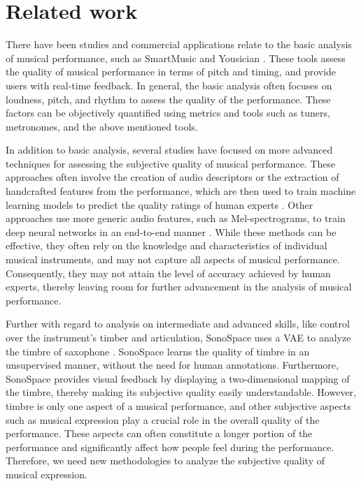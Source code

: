 \documentclass[manuscript,review,anonymous]{acmart}
\begin{document}
\section{Related work}
There have been studies and commercial applications relate to the basic analysis of musical performance, such as SmartMusic \cite{SmartMus76:online} and Yousician \cite{Yousicia62:online}. 
These tools assess the quality of musical performance in terms of pitch and timing, and provide users with real-time feedback. 
In general, the basic analysis often focuses on loudness, pitch, and rhythm to assess the quality of the performance.
These factors can be objectively quantified using metrics and tools such as tuners, metronomes, and the above mentioned tools. 

In addition to basic analysis, several studies have focused on more advanced techniques for assessing the subjective quality of musical performance. 
These approaches often involve the creation of audio descriptors or the extraction of handcrafted features from the performance, which are then used to train machine learning models to predict the quality ratings of human experts \cite{nakano2006automatic,PDFAreal4:online, vidwans2017objective}. 
Other approaches use more generic audio features, such as Mel-spectrograms, to train deep neural networks in an end-to-end manner \cite{app8040507}. 
While these methods can be effective, they often rely on the knowledge and characteristics of individual musical instruments, and may not capture all aspects of musical performance. 
Consequently, they may not attain the level of accuracy achieved by human experts, thereby leaving room for further advancement in the analysis of musical performance.

Further with regard to analysis on intermediate and advanced skills, like control over the instrument's timber and articulation, SonoSpace uses a VAE to analyze the timbre of saxophone \cite{SonoSpace}. 
SonoSpace learns the quality of timbre in an unsupervised manner, without the need for human annotations. 
Furthermore, SonoSpace provides visual feedback by displaying a two-dimensional mapping of the timbre, thereby making its subjective quality easily understandable. 
However, timbre is only one aspect of a musical performance, and other subjective aspects such as musical expression play a crucial role in the overall quality of the performance. 
These aspects can often constitute a longer portion of the performance and significantly affect how people feel during the performance.
Therefore, we need new methodologies to analyze the subjective quality of musical expression.
\end{document}
